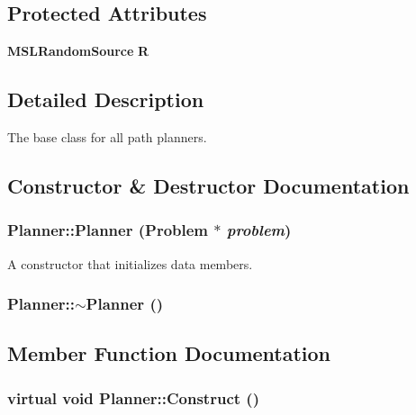 \subsection*{Protected Attributes}
\begin{CompactItemize}
\item 
{\bf MSLRandom\-Source} {\bf R}
\end{CompactItemize}


\subsection{Detailed Description}
The base class for all path planners.



\subsection{Constructor \& Destructor Documentation}
\subsubsection{\setlength{\rightskip}{0pt plus 5cm}Planner::Planner ({\bf Problem} $\ast$ {\em problem})}\label{classPlanner_a0}


A constructor that initializes data members.

\subsubsection{\setlength{\rightskip}{0pt plus 5cm}Planner::$\sim$Planner ()}\label{classPlanner_a1}




\subsection{Member Function Documentation}
\subsubsection{\setlength{\rightskip}{0pt plus 5cm}virtual void Planner::Construct ()\hspace{0.3cm}{\tt  [pure virtual]}}\label{classPlanner_a3}


